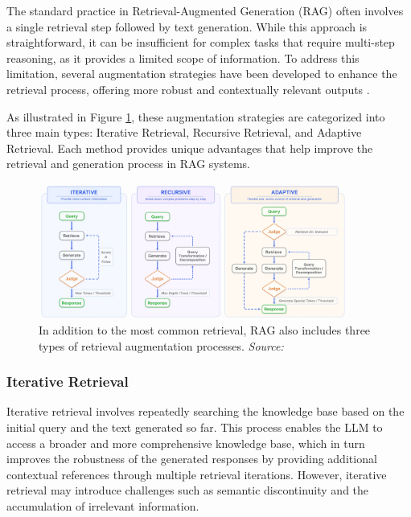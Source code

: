 The standard practice in Retrieval-Augmented Generation (RAG) often involves a single retrieval step followed by text generation. While this approach is straightforward, it can be insufficient for complex tasks that require multi-step reasoning, as it provides a limited scope of information. To address this limitation, several augmentation strategies have been developed to enhance the retrieval process, offering more robust and contextually relevant outputs \cite{yoran2023making}.

As illustrated in Figure \ref{fig:rag_augmentation}, these augmentation strategies are categorized into three main types: Iterative Retrieval, Recursive Retrieval, and Adaptive Retrieval. Each method provides unique advantages that help improve the retrieval and generation process in RAG systems.

\begin{figure}[h]
    \centering
    \includegraphics[width=0.9\textwidth]{images/llms/augmentation-process.png}
    \caption{In addition to the most common retrieval, RAG also includes three types of retrieval augmentation processes. \textit{Source:} \cite{gao2023retrieval}}
    \label{fig:rag_augmentation}
\end{figure}

\subsubsection{Iterative Retrieval}

Iterative retrieval involves repeatedly searching the knowledge base based on the initial query and the text generated so far. This process enables the LLM to access a broader and more comprehensive knowledge base, which in turn improves the robustness of the generated responses by providing additional contextual references through multiple retrieval iterations. However, iterative retrieval may introduce challenges such as semantic discontinuity and the accumulation of irrelevant information.

